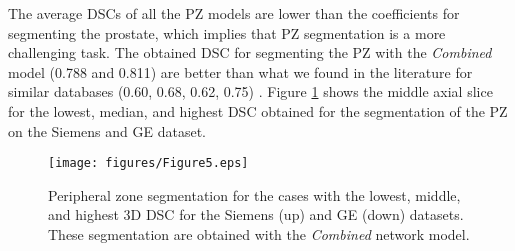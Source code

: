 The average DSCs of all the PZ models are lower than the coefficients for segmenting the prostate, which implies that PZ segmentation is a more challenging task. The obtained DSC for segmenting the PZ with the \emph{Combined} model (0.788 and 0.811) are better than what we found in the literature for similar databases (0.60, 0.68, 0.62, 0.75) \cite{mooij_automatic_2018,toth_simultaneous_2013, chilali_gland_2016, hutchison_pattern_2012}. Figure \ref{fig:ressegpz} shows the middle axial slice for the lowest, median, and highest DSC obtained for the segmentation of the PZ on the Siemens and GE dataset. 
\begin{figure}[h]
    \centering
    \texttt{[image: figures/Figure5.eps]}
    \caption{Peripheral zone segmentation for the cases with the lowest, middle, and highest 3D DSC for the Siemens (up) and GE (down) datasets. These segmentation are obtained with the \emph{Combined} network model.  }
    \label{fig:ressegpz}
\end{figure} 




